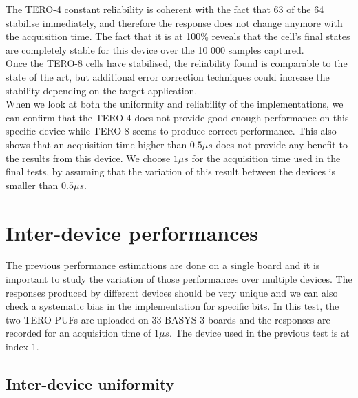 The TERO-4 constant reliability is coherent with the fact that 63 of the 64 stabilise immediately, and therefore the response does not change anymore with the acquisition time. The fact that it is at 100\% reveals that the cell's final states are completely stable for this device over the 10 000 samples captured.\\

Once the TERO-8 cells have stabilised, the reliability found is comparable to the state of the art, but additional error correction techniques could increase the stability depending on the target application.\\

When we look at both the uniformity and reliability of the implementations, we can confirm that the TERO-4 does not provide good enough performance on this specific device while TERO-8 seems to produce correct performance. This also shows that an acquisition time higher than $0.5 \mu s$ does not provide any benefit to the results from this device. We choose $1 \mu s$ for the acquisition time used in the final tests, by assuming that the variation of this result between the devices is smaller than $0.5 \mu s$.


\section{Inter-device performances}

\label{sec:inter_device_perf}

The previous performance estimations are done on a single board and it is important to study the variation of those performances over multiple devices. The responses produced by different devices should be very unique and we can also check a systematic bias in the implementation for specific bits. In this test, the two TERO PUFs are uploaded on 33 BASYS-3 boards and the responses are recorded for an acquisition time of $1\mu s$. The device used in the previous test is at index 1.

\subsection{Inter-device uniformity}


